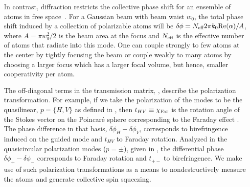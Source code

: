 \documentclass[aps,pra,twocolumn]{revtex4-1} %
\newcommand{\error}[1]{{\color{red} #1}}
\begin{document}
In contrast, diffraction restricts the collective phase shift for an ensemble of atoms in free space~\cite{tanji-suzuki_chapter_2011, baragiola_three-dimensional_2014}.  For a Gaussian beam with beam waist $w_0$, the total phase shift induced by a collection of polarizable atoms will be $\delta \phi = N_{\text{eff}} 2 \pi k_0 {\rm Re}({\alpha})/A$, where $A = \pi w^2_0/2$ is the beam area at the focus and $N_{\text{eff}}$ is the effective number of atoms that radiate into this mode.  
One can couple strongly to few atoms at the center by tightly focusing the beam or couple weakly to many atoms by choosing a larger focus which has a larger focal volume, but hence, smaller cooperativity per atom.  


The off-diagonal terms in the transmission matrix, , describe the polarization transformation. For example, if we take the polarization of the modes to be the quasilinear, $p = \{H,V\}$ as defined in , then $t_{HV} \equiv \chi_{\rm Far}$ is the rotation angle of the Stokes vector on the Poincar\'{e} sphere corresponding to the Faraday effect \cite{hammerer_quantum_2010, deutsch_quantum_2010}.  
The phase difference in that basis, $\delta  \phi_H - \delta \phi_V$, corresponds to birefringence induced on the guided mode and $t_{HV}$ to Faraday rotation.  
Analyzed in the quasicircular polarization modes ($p=\pm$), given in , the differential phase $\delta \phi_+ -\delta  \phi_-$ corresponds to Faraday rotation and $t_{+-}$ to birefringence.  
We make use of such polarization transformations as a means to nondestructively measure the atoms and generate collective spin squeezing.


\end{document}
